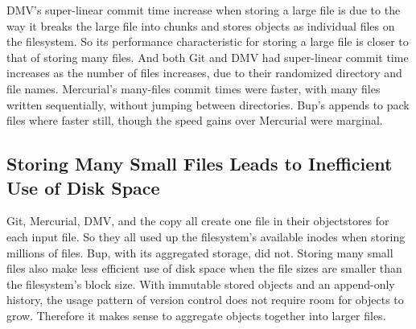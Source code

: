 DMV's super-linear commit time increase when storing a large file is due to the way it breaks the large file into chunks and stores objects as individual files on the filesystem.
So its performance characteristic for storing a large file is closer to that of storing many files.
And both Git and DMV had super-linear commit time increases as the number of files increases, due to their randomized directory and file names.
Mercurial's many-files commit times were faster, with many files written sequentially, without jumping between directories.
Bup's appends to pack files where faster still, though the speed gains over Mercurial were marginal.


\subsection{Storing Many Small Files Leads to Inefficient Use of Disk Space}

Git, Mercurial, DMV, and the copy all create one file in their \glspl{objectstore} for each input file.
So they all used up the filesystem's available inodes when storing millions of files.
Bup, with its aggregated storage, did not.
Storing many small files also make less efficient use of disk space when the file sizes are smaller than the filesystem's block size.
With immutable stored objects and an append-only history, the usage pattern of version control does not require room for objects to grow.
Therefore it makes sense to aggregate objects together into larger files.

%
